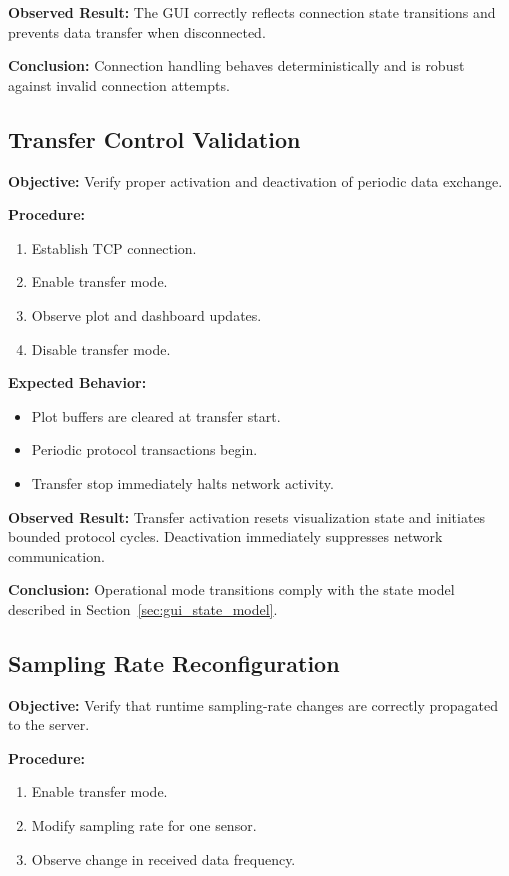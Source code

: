 \textbf{Observed Result:}  
The GUI correctly reflects connection state transitions and prevents data transfer when disconnected.

\textbf{Conclusion:}  
Connection handling behaves deterministically and is robust against invalid connection attempts.

\subsection{Transfer Control Validation}
\label{sec:gui_validation_transfer}

\textbf{Objective:}  
Verify proper activation and deactivation of periodic data exchange.

\textbf{Procedure:}
\begin{enumerate}
	\item Establish TCP connection.
	\item Enable transfer mode.
	\item Observe plot and dashboard updates.
	\item Disable transfer mode.
\end{enumerate}

\textbf{Expected Behavior:}
\begin{itemize}
	\item Plot buffers are cleared at transfer start.
	\item Periodic protocol transactions begin.
	\item Transfer stop immediately halts network activity.
\end{itemize}

\textbf{Observed Result:}  
Transfer activation resets visualization state and initiates bounded protocol cycles. Deactivation immediately suppresses network communication.

\textbf{Conclusion:}  
Operational mode transitions comply with the state model described in Section~\ref{sec:gui_state_model}.

\subsection{Sampling Rate Reconfiguration}
\label{sec:gui_validation_sampling}

\textbf{Objective:}  
Verify that runtime sampling-rate changes are correctly propagated to the server.

\textbf{Procedure:}
\begin{enumerate}
	\item Enable transfer mode.
	\item Modify sampling rate for one sensor.
	\item Observe change in received data frequency.
\end{enumerate}

